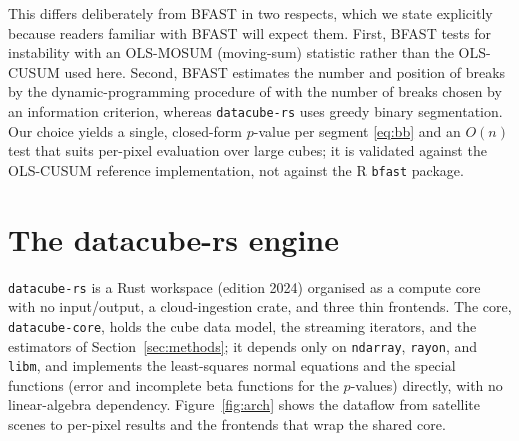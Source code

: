 \documentclass[review]{elsarticle}
\begin{document}
This differs deliberately from BFAST in two respects, which we state explicitly
because readers familiar with BFAST will expect them. First, BFAST tests for
instability with an OLS-MOSUM (moving-sum) statistic rather than the OLS-CUSUM
used here. Second, BFAST estimates the number and position of breaks by the
dynamic-programming procedure of \citet{baiperron2003} with the number of breaks
chosen by an information criterion, whereas \texttt{datacube-rs} uses greedy
binary segmentation. Our choice yields a single, closed-form $p$-value per
segment \eqref{eq:bb} and an $O(n)$ test that suits per-pixel evaluation over
large cubes; it is validated against the OLS-CUSUM reference implementation, not
against the R \texttt{bfast} package.

\section{The datacube-rs engine}
\label{sec:engine}

\texttt{datacube-rs} is a Rust workspace (edition 2024) organised as a compute
core with no input/output, a cloud-ingestion crate, and three thin frontends.
The core, \texttt{datacube-core}, holds the cube data model, the streaming
iterators, and the estimators of Section~\ref{sec:methods}; it depends only on
\texttt{ndarray}, \texttt{rayon}, and \texttt{libm}, and implements the
least-squares normal equations and the special functions (error and incomplete
beta functions for the $p$-values) directly, with no linear-algebra dependency.
Figure~\ref{fig:arch} shows the dataflow from satellite scenes to per-pixel
results and the frontends that wrap the shared core.
\end{document}
